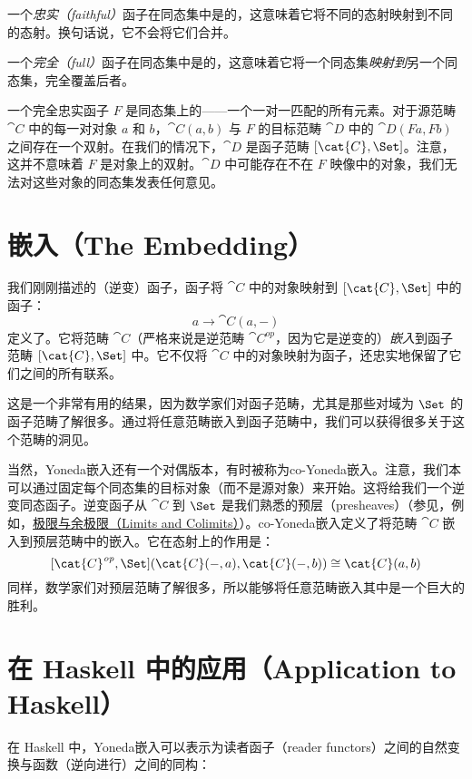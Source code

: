一个\emph{忠实（faithful）}函子在同态集中是的，这意味着它将不同的态射映射到不同的态射。换句话说，它不会将它们合并。

一个\emph{完全（full）}函子在同态集中是的，这意味着它将一个同态集\emph{映射到}另一个同态集，完全覆盖后者。

一个完全忠实函子 $F$ 是同态集上的——一个一对一匹配的所有元素。对于源范畴 $\cat{C}$ 中的每一对对象 $a$ 和 $b$，$\cat{C}(a, b)$ 与 $F$ 的目标范畴 $\cat{D}$ 中的 $\cat{D}(F a, F b)$ 之间存在一个双射。在我们的情况下，$\cat{D}$ 是函子范畴 $[\cat{C}, \Set]$。注意，这并不意味着 $F$ 是对象上的双射。$\cat{D}$ 中可能存在不在 $F$ 映像中的对象，我们无法对这些对象的同态集发表任何意见。

\section{嵌入（The Embedding）}

我们刚刚描述的（逆变）函子，函子将 $\cat{C}$ 中的对象映射到 $[\cat{C}, \Set]$ 中的函子：
\[a \to \cat{C}(a, -)\]
定义了。它将范畴 $\cat{C}$（严格来说是逆范畴 $\cat{C}^\mathit{op}$，因为它是逆变的）\emph{嵌入}到函子范畴 $[\cat{C}, \Set]$ 中。它不仅将 $\cat{C}$ 中的对象映射为函子，还忠实地保留了它们之间的所有联系。

这是一个非常有用的结果，因为数学家们对函子范畴，尤其是那些对域为 $\Set$ 的函子范畴了解很多。通过将任意范畴嵌入到函子范畴中，我们可以获得很多关于这个范畴的洞见。

当然，Yoneda嵌入还有一个对偶版本，有时被称为co-Yoneda嵌入。注意，我们本可以通过固定每个同态集的目标对象（而不是源对象）来开始。这将给我们一个逆变同态函子。逆变函子从 $\cat{C}$ 到 $\Set$ 是我们熟悉的预层（presheaves）（参见，例如，\hyperref[limits-and-colimits]{极限与余极限（Limits and Colimits）}）。co-Yoneda嵌入定义了将范畴 $\cat{C}$ 嵌入到预层范畴中的嵌入。它在态射上的作用是：
\[[\cat{C}^\mathit{op}, \Set](\cat{C}(-, a), \cat{C}(-, b)) \cong \cat{C}(a, b)\]
同样，数学家们对预层范畴了解很多，所以能够将任意范畴嵌入其中是一个巨大的胜利。

\section{在 Haskell 中的应用（Application to Haskell）}

在 Haskell 中，Yoneda嵌入可以表示为读者函子（reader functors）之间的自然变换与函数（逆向进行）之间的同构：

